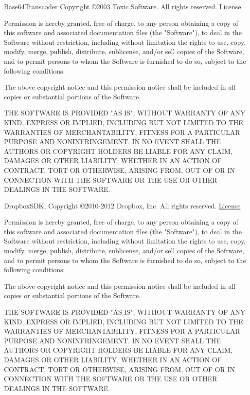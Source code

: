 \documentclass[oneside, openany, 12pt]{tufte-book}
\newcommand{\licensetext}{\scriptsize \setlength{\parskip}{0mm} \singlespacing}
\begin{document}
Base64Transcoder Copyright \copyright 2003 Toxic Software. All rights reserved. \href{http://www.opensource.org/licenses/mit-license.php}{License}

{\licensetext Permission is hereby granted, free of charge, to any person obtaining a copy
of this software and associated documentation files (the "Software"), to deal
in the Software without restriction, including without limitation the rights
to use, copy, modify, merge, publish, distribute, sublicense, and/or sell
copies of the Software, and to permit persons to whom the Software is
furnished to do so, subject to the following conditions:

The above copyright notice and this permission notice shall be included in
all copies or substantial portions of the Software.

THE SOFTWARE IS PROVIDED "AS IS", WITHOUT WARRANTY OF ANY KIND, EXPRESS OR
IMPLIED, INCLUDING BUT NOT LIMITED TO THE WARRANTIES OF MERCHANTABILITY,
FITNESS FOR A PARTICULAR PURPOSE AND NONINFRINGEMENT. IN NO EVENT SHALL THE
AUTHORS OR COPYRIGHT HOLDERS BE LIABLE FOR ANY CLAIM, DAMAGES OR OTHER
LIABILITY, WHETHER IN AN ACTION OF CONTRACT, TORT OR OTHERWISE, ARISING FROM,
OUT OF OR IN CONNECTION WITH THE SOFTWARE OR THE USE OR OTHER DEALINGS IN
THE SOFTWARE.}

DropboxSDK, Copyright \copyright 2010-2012 Dropbox, Inc. All rights reserved. \href{http://www.opensource.org/licenses/mit-license.php}{License}

{\licensetext Permission is hereby granted, free of charge, to any person obtaining a copy of this software and associated documentation files (the "Software"), to deal in the Software without restriction, including without limitation the rights to use, copy, modify, merge, publish, distribute, sublicense, and/or sell copies of the Software, and to permit persons to whom the Software is furnished to do so, subject to the following conditions:

The above copyright notice and this permission notice shall be included in all copies or substantial portions of the Software.

THE SOFTWARE IS PROVIDED "AS IS", WITHOUT WARRANTY OF ANY KIND, EXPRESS OR IMPLIED, INCLUDING BUT NOT LIMITED TO THE WARRANTIES OF MERCHANTABILITY, FITNESS FOR A PARTICULAR PURPOSE AND NONINFRINGEMENT. IN NO EVENT SHALL THE AUTHORS OR COPYRIGHT HOLDERS BE LIABLE FOR ANY CLAIM, DAMAGES OR OTHER LIABILITY, WHETHER IN AN ACTION OF CONTRACT, TORT OR OTHERWISE, ARISING FROM, OUT OF OR IN CONNECTION WITH THE SOFTWARE OR THE USE OR OTHER DEALINGS IN THE SOFTWARE.}
\end{document}
